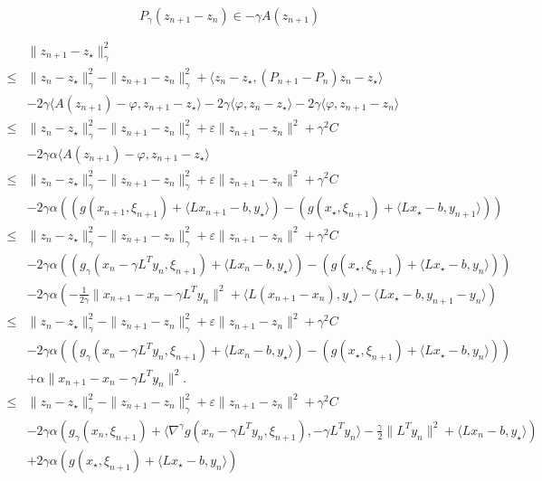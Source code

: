\documentclass{article}
\newcommand{\ps}[1]{\langle #1 \rangle}
\theoremstyle{definition}
\begin{document}
$$
P_\gamma(z_{n+1} - z_n) \in -\gamma A(z_{n+1}) 
$$


\begin{align*}
&\|z_{n+1} - z_\star\|_\gamma^2 \\
\leq &\|z_{n} - z_\star\|_\gamma^2 - \|z_{n+1} - z_{n}\|_\gamma^2 + \ps{z_n - z_\star,(P_{n+1} - P_n)z_n - z_\star}\\
& -2\gamma \ps{A(z_{n+1}) - \varphi,z_{n+1} - z_\star} -2\gamma \ps{\varphi,z_{n} - z_\star} -2\gamma \ps{\varphi,z_{n+1} - z_n}\\
\leq &\|z_{n} - z_\star\|_\gamma^2 - \|z_{n+1} - z_{n}\|_\gamma^2 +  \varepsilon \|z_{n+1} - z_{n}\|^2 + \gamma^2 C\\
& -2\gamma \alpha \ps{A(z_{n+1}) - \varphi,z_{n+1} - z_\star} \\
\leq &\|z_{n} - z_\star\|_\gamma^2 - \|z_{n+1} - z_{n}\|_\gamma^2 +  \varepsilon \|z_{n+1} - z_{n}\|^2 + \gamma^2 C\\
& -2\gamma\alpha \left(( g(x_{n+1},\xi_{n+1}) + \ps{L x_{n+1} - b,y_\star} ) - ( g(x_\star,\xi_{n+1}) + \ps{L x_\star - b,y_{n+1}} )\right)\\
\leq &\|z_{n} - z_\star\|_\gamma^2 - \|z_{n+1} - z_{n}\|_\gamma^2 +  \varepsilon \|z_{n+1} - z_{n}\|^2 + \gamma^2 C\\
& -2\gamma\alpha \left(( g_\gamma(x_{n} - \gamma L^T y_{n},\xi_{n+1}) + \ps{L x_{n}-b,y_\star} ) - ( g(x_\star,\xi_{n+1}) + \ps{L x_\star-b,y_{n}} )\right)\\
& -2\gamma\alpha \left(-\frac{1}{2\gamma}\|x_{n+1} - x_n - \gamma L^T y_n\|^2 + \ps{L (x_{n+1} - x_n),y_\star} - \ps{L x_\star - b,y_{n+1} - y_n}\right)\\
\leq &\|z_{n} - z_\star\|_\gamma^2 - \|z_{n+1} - z_{n}\|_\gamma^2 + \varepsilon \|z_{n+1} - z_{n}\|^2 + \gamma^2 C \\
& -2\gamma\alpha \left(( g_\gamma(x_{n} - \gamma L^T y_{n},\xi_{n+1}) + \ps{L x_{n}-b,y_\star} ) - ( g(x_\star,\xi_{n+1}) + \ps{L x_\star-b,y_{n}} )\right)\\
& + \alpha\|x_{n+1} - x_n - \gamma L^T y_n\|^2.\\
\leq &\|z_{n} - z_\star\|_\gamma^2 - \|z_{n+1} - z_{n}\|_\gamma^2 + \varepsilon \|z_{n+1} - z_{n}\|^2 + \gamma^2 C \\
& -2\gamma\alpha \left( g_\gamma(x_{n},\xi_{n+1}) + \ps{\nabla^\gamma g(x_n-\gamma L^T y_n,\xi_{n+1}), -\gamma L^T y_n} - \frac{\gamma}{2}\|L^T y_n\|^2 + \ps{L x_{n}-b,y_\star} \right) \\
& +2\gamma \alpha \left( g(x_\star,\xi_{n+1}) + \ps{L x_\star -b,y_{n}} \right)\\

\end{align*}
\end{document}
